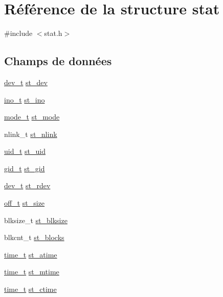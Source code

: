 \hypertarget{structstat}{\section{\-Référence de la structure stat}
\label{structstat}
}


{\ttfamily \#include $<$stat.\-h$>$}

\subsection*{\-Champs de données}
\begin{DoxyCompactItemize}
\item 
\hyperlink{stat_8h_a451f1b5788fa7cc5d33db47a5992e7a6}{dev\-\_\-t} \hyperlink{structstat_ac5b90090ae323741ae4c9e4f3683a29f}{st\-\_\-dev}
\item 
\hyperlink{stat_8h_aed4e918b44240739869c4bdb1c4787a9}{ino\-\_\-t} \hyperlink{structstat_a9769ed8f0d4c5a9f329c32bc92479d56}{st\-\_\-ino}
\item 
\hyperlink{stat_8h_af8f4385bb42836d1e3ad4fea9d71d1b9}{mode\-\_\-t} \hyperlink{structstat_a5cbdd829011af82ba61e83773bbcbc7d}{st\-\_\-mode}
\item 
nlink\-\_\-t \hyperlink{structstat_a0ed9092fa6c77a3251b9b9a4738ef84f}{st\-\_\-nlink}
\item 
\hyperlink{stat_8h_af2306308627701b66dc6f3babe821ab4}{uid\-\_\-t} \hyperlink{structstat_a4a8708a3d18be60ee7b2f06c4cab0c70}{st\-\_\-uid}
\item 
\hyperlink{stat_8h_aa7352f1065fe606194d792e2b292cf83}{gid\-\_\-t} \hyperlink{structstat_ab864f16f436cec370f0ced585d897698}{st\-\_\-gid}
\item 
\hyperlink{stat_8h_a451f1b5788fa7cc5d33db47a5992e7a6}{dev\-\_\-t} \hyperlink{structstat_aa61e6c1a8a91c69f1d26f6700a0546cb}{st\-\_\-rdev}
\item 
\hyperlink{types_8h_a447a6a64dbb8fb44b1e62856b333db4a}{off\-\_\-t} \hyperlink{structstat_a040e19c8b9766f841fde8786ce9297bf}{st\-\_\-size}
\item 
blksize\-\_\-t \hyperlink{structstat_a38d474e1ae3cf6fbdde89ac3c3e308f1}{st\-\_\-blksize}
\item 
blkcnt\-\_\-t \hyperlink{structstat_a42dd716b2f9234f961d949fc9500eefb}{st\-\_\-blocks}
\item 
\hyperlink{time_8h_aaaf414ca0598a3633e6e9161cbb5a58a}{time\-\_\-t} \hyperlink{structstat_ab74d1e7e345e88b9d0fb2688a97cba64}{st\-\_\-atime}
\item 
\hyperlink{time_8h_aaaf414ca0598a3633e6e9161cbb5a58a}{time\-\_\-t} \hyperlink{structstat_a77e235090f8cb6897f1c0ce65689006b}{st\-\_\-mtime}
\item 
\hyperlink{time_8h_aaaf414ca0598a3633e6e9161cbb5a58a}{time\-\_\-t} \hyperlink{structstat_a1b4b858db1ebe79c3d6e0fc1ef721024}{st\-\_\-ctime}
\end{DoxyCompactItemize}


